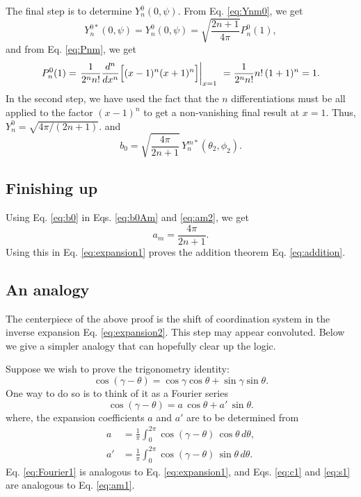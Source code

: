 \documentclass[11pt]{article}
\begin{document}
The final step is to determine $Y_n^0(0, \psi)$.
From Eq. \eqref{eq:Ynm0}, we get
\[
  Y_n^{0*}(0, \psi)
=
  Y_n^0(0, \psi)
=
  \sqrt{
    \frac { 2 n + 1 } { 4 \pi }
  }
  P_{n}^0(1),
\]
and
from Eq. \eqref{eq:Pnm}, we get
\[
  P_{n}^{0}(1)
=
  \left.
  \frac{ 1 } { 2^{n} n! }
  \frac{ d^{n} } { d x^{n} }
  \Bigl[
    (x - 1)^{n}
    (x + 1)^{n}
  \Bigr]
  \right|_{x = 1}\
= \frac{ 1 } { 2^{n} n! }
  n! \, (1 + 1)^n
= 1.
\]
In the second step,
we have used the fact that
the $n$ differentiations must be
all applied to the factor $(x - 1)^n$
to get a non-vanishing final result at $x = 1$.
%
Thus,
$Y_n^0 = \sqrt{4\pi/(2n+1)}$.
and
\begin{equation}
b_0 = \sqrt{ \frac {4 \pi} { 2 n + 1 } } \, Y_n^{m*}(\theta_2, \phi_2).
\label{eq:b0}
\end{equation}



\subsection{Finishing up}



Using Eq. \eqref{eq:b0} in Eqs. \eqref{eq:b0Am} and \eqref{eq:am2},
we get
\begin{equation}
  a_m = \frac{ 4 \pi } { 2 n + 1 }.
\end{equation}
Using this in Eq. \eqref{eq:expansion1}
proves the addition theorem Eq. \eqref{eq:addition}.




\subsection{An analogy}



The centerpiece of the above proof is the shift of coordination system
in the inverse expansion Eq. \eqref{eq:expansion2}.
This step may appear convoluted.
Below we give a simpler analogy
that can hopefully clear up the logic.

Suppose we wish to prove the trigonometry identity:
\begin{equation}
  \cos(\gamma - \theta)
= \cos\gamma \cos\theta
+ \sin\gamma \sin\theta.
\label{eq:cosab}
\end{equation}
One way to do so is to think of it as a Fourier series
\begin{equation}
  \cos(\gamma - \theta)
=
  a \, \cos\theta
+
  a' \, \sin\theta.
  \label{eq:Fourier1}
\end{equation}
where, the expansion coefficients $a$ and $a'$
are to be determined from
\begin{align}
a &= \frac{1}{\pi} \int_0^{2\pi}
  \cos(\gamma - \theta) \, \cos\theta \, d\theta,
  \label{eq:c1}
\\
a' &= \frac{1}{\pi} \int_0^{2\pi}
  \cos(\gamma - \theta) \, \sin\theta \, d\theta.
  \label{eq:s1}
\end{align}
Eq. \eqref{eq:Fourier1} is analogous to Eq. \eqref{eq:expansion1},
and Eqs. \eqref{eq:c1} and \eqref{eq:s1}
are analogous to Eq. \eqref{eq:am1}.
\end{document}
